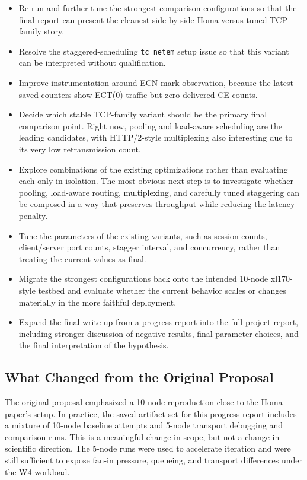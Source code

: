 \documentclass[11pt]{article}
\begin{document}
\begin{itemize}[leftmargin=1.5em]
  \item Re-run and further tune the strongest comparison configurations so that the final report can present the cleanest side-by-side Homa versus tuned TCP-family story.
  \item Resolve the staggered-scheduling \texttt{tc netem} setup issue so that this variant can be interpreted without qualification.
  \item Improve instrumentation around ECN-mark observation, because the latest saved counters show ECT(0) traffic but zero delivered CE counts.
  \item Decide which stable TCP-family variant should be the primary final comparison point. Right now, pooling and load-aware scheduling are the leading candidates, with HTTP/2-style multiplexing also interesting due to its very low retransmission count.
  \item Explore combinations of the existing optimizations rather than evaluating each only in isolation. The most obvious next step is to investigate whether pooling, load-aware routing, multiplexing, and carefully tuned staggering can be composed in a way that preserves throughput while reducing the latency penalty.
  \item Tune the parameters of the existing variants, such as session counts, client/server port counts, stagger interval, and concurrency, rather than treating the current values as final.
  \item Migrate the strongest configurations back onto the intended 10-node xl170-style testbed and evaluate whether the current behavior scales or changes materially in the more faithful deployment.
  \item Expand the final write-up from a progress report into the full project report, including stronger discussion of negative results, final parameter choices, and the final interpretation of the hypothesis.
\end{itemize}

\subsection{What Changed from the Original Proposal}

The original proposal emphasized a 10-node reproduction close to the Homa paper's setup. In practice, the saved artifact set for this progress report includes a mixture of 10-node baseline attempts and 5-node transport debugging and comparison runs. This is a meaningful change in scope, but not a change in scientific direction. The 5-node runs were used to accelerate iteration and were still sufficient to expose fan-in pressure, queueing, and transport differences under the W4 workload.
\end{document}
